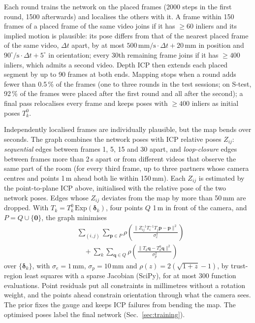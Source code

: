 \documentclass[9pt,shortpaper,twoside,web]{ieeecolor2}
\newcommand{\Stest}{S-test}
\begin{document}
Each round trains the network on the placed frames (2000 steps in the first round, 1500 afterwards) and localises the others with it. A frame within 150 frames of a placed frame of the same video joins if it has $\ge60$ inliers and its implied motion is plausible: its pose differs from that of the nearest placed frame of the same video, $\Delta t$ apart, by at most $500\,\mathrm{mm/s}\cdot\Delta t+20$\,mm in position and $90^\circ/\mathrm{s}\cdot\Delta t+5^\circ$ in orientation; every 30th remaining frame joins if it has $\ge400$ inliers, which admits a second video. Depth ICP then extends each placed segment by up to 90 frames at both ends. Mapping stops when a round adds fewer than 0.5\,\% of the frames (one to three rounds in the test sessions; on \Stest{}, 92\,\% of the frames were placed after the first round and all after the second); a final pass relocalises every frame and keeps poses with $\ge400$ inliers as initial poses $T^0_k$.

Independently localised frames are individually plausible, but the map bends over seconds. The graph combines the network poses with ICP relative poses $Z_{ij}$: \emph{sequential} edges between frames 1, 5, 15 and 30 apart, and \emph{loop-closure} edges between frames more than 2\,s apart or from different videos that observe the same part of the room (for every third frame, up to three partners whose camera centres and points 1\,m ahead both lie within 150\,mm). Each $Z_{ij}$ is estimated by the point-to-plane ICP above, initialised with the relative pose of the two network poses. Edges whose $Z_{ij}$ deviates from the map by more than 50\,mm are dropped. With $T_k=T^0_k\,\mathrm{Exp}(\boldsymbol{\delta}_k)$, four points $Q$ 1\,m in front of the camera, and $P=Q\cup\{\mathbf{0}\}$, the graph minimises
\begin{equation}
  \begin{aligned}
  &\sum_{(i,j)}\sum_{\mathbf{p}\in P}\rho\!\left(\frac{\|Z_{ij}^{-1}T_i^{-1}T_j\mathbf{p}-\mathbf{p}\|^2}{\sigma_e^2}\right)\\
  &\quad+\sum_{k}\sum_{\mathbf{q}\in Q}\rho\!\left(\frac{\|T_k\mathbf{q}-T^0_k\mathbf{q}\|^2}{\sigma_p^2}\right)
  \end{aligned}
  \label{eq:posegraph}
\end{equation}
over $\{\boldsymbol{\delta}_k\}$, with $\sigma_e=1$\,mm, $\sigma_p=10$\,mm and $\rho(z)=2(\sqrt{1+z}-1)$, by trust-region least squares with a sparse Jacobian (SciPy), for at most 300 function evaluations. Point residuals put all constraints in millimetres without a rotation weight, and the points ahead constrain orientation through what the camera sees. The prior fixes the gauge and keeps ICP failures from bending the map. The optimised poses label the final network (Sec.~\ref{sec:training}).
\end{document}
